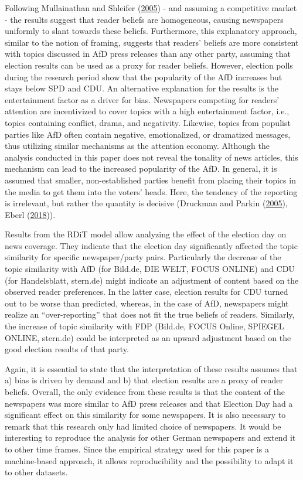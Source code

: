 \documentclass[
  12pt,
]{article}
\begin{document}
Following Mullainathan and Shleifer
(\protect\hyperlink{ref-mullainathan_market_2005}{2005}) - and assuming
a competitive market - the results suggest that reader beliefs are
homogeneous, causing newspapers uniformly to slant towards these
beliefs. Furthermore, this explanatory approach, similar to the notion
of framing, suggests that readers' beliefs are more consistent with
topics discussed in AfD press releases than any other party, assuming
that election results can be used as a proxy for reader beliefs.
However, election polls during the research period show that the
popularity of the AfD increases but stays below SPD and CDU. An
alternative explanation for the results is the entertainment factor as a
driver for bias. Newspapers competing for readers' attention are
incentivized to cover topics with a high entertainment factor, i.e.,
topics containing conflict, drama, and negativity. Likewise, topics from
populist parties like AfD often contain negative, emotionalized, or
dramatized messages, thus utilizing similar mechanisms as the attention
economy. Although the analysis conducted in this paper does not reveal
the tonality of news articles, this mechanism can lead to the increased
popularity of the AfD. In general, it is assumed that smaller,
non-established parties benefit from placing their topics in the media
to get them into the voters' heads. Here, the tendency of the reporting
is irrelevant, but rather the quantity is decisive (Druckman and Parkin
(\protect\hyperlink{ref-druckman_impact_2005}{2005}), Eberl
(\protect\hyperlink{ref-eberl_lying_2018}{2018})).

Results from the RDiT model allow analyzing the effect of the election
day on news coverage. They indicate that the election day significantly
affected the topic similarity for specific newspaper/party pairs.
Particularly the decrease of the topic similarity with AfD (for Bild.de,
DIE WELT, FOCUS ONLINE) and CDU (for Handelsblatt, stern.de) might
indicate an adjustment of content based on the observed reader
preferences. In the latter case, election results for CDU turned out to
be worse than predicted, whereas, in the case of AfD, newspapers might
realize an ``over-reporting'' that does not fit the true beliefs of
readers. Similarly, the increase of topic similarity with FDP (Bild.de,
FOCUS Online, SPIEGEL ONLINE, stern.de) could be interpreted as an
upward adjustment based on the good election results of that party.

Again, it is essential to state that the interpretation of these results
assumes that a) bias is driven by demand and b) that election results
are a proxy of reader beliefs. Overall, the only evidence from these
results is that the content of the newspapers was more similar to AfD
press releases and that Election Day had a significant effect on this
similarity for some newspapers. It is also necessary to remark that this
research only had limited choice of newspapers. It would be interesting
to reproduce the analysis for other German newspapers and extend it to
other time frames. Since the empirical strategy used for this paper is a
machine-based approach, it allows reproducibility and the possibility to
adapt it to other datasets.
\end{document}
